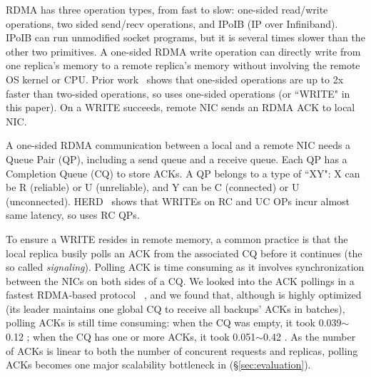 RDMA has three operation types, from fast to slow: one-sided 
read/write operations, two sided send/recv operations, and IPoIB (IP over 
Infiniband). IPoIB can run unmodified socket programs, but it is several times 
slower than the other two primitives. A one-sided RDMA write 
operation can directly write from one replica's memory to a remote 
replica's memory without involving the remote OS kernel or CPU. Prior 
work~\cite{pilaf:usenix14} shows that one-sided operations are up to 2x faster 
than two-sided operations, so \xxx uses one-sided operations (or 
``WRITE" in this paper). On a WRITE succeeds, remote NIC sends
an RDMA ACK to local NIC.

A one-sided RDMA communication between a local and a remote NIC needs
a Queue Pair (QP), including a send queue and a receive 
queue. Each QP has a Completion Queue (CQ) to store ACKs. A QP 
belongs to a type of ``XY": X can be R (reliable) or U (unreliable), and Y can 
be C (connected) or U (unconnected). HERD~\cite{herd:sigcomm14} shows 
that WRITEs on RC and UC OPs incur almost same latency, so \xxx 
uses RC QPs.




To ensure a WRITE resides in remote memory, a common practice is that the 
local replica busily polls an ACK from the associated CQ before it continues 
(the so called \emph{signaling}). Polling ACK is time consuming as it involves 
synchronization between the NICs on both sides of a CQ. We looked into the ACK 
pollings in a fastest RDMA-based \paxos protocol \dare~\cite{dare:hpdc15}, 
and we found that, although \dare is highly optimized (its leader maintains one 
global CQ to receive all backups' ACKs in batches), polling ACKs is still time 
consuming: when the CQ was empty, it took 0.039$\sim$0.12 \us; when the CQ has 
one or more ACKs, it took 0.051$\sim$0.42 \us. As the number of ACKs is linear 
to both the number of concurent requests and replicas, polling ACKs becomes one 
major scalability bottleneck in \dare (\S\ref{sec:evaluation}).


